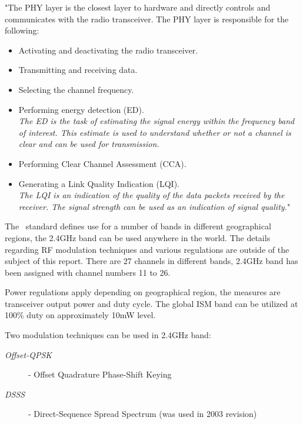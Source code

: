 
 "The PHY layer is the closest layer to hardware and directly controls
 and communicates with the radio transceiver.
 The PHY layer is responsible for the following:
 \begin{itemize}

        \item Activating and deactivating the radio transceiver.

	\item Transmitting and receiving data.

	\item Selecting the channel frequency.

	\item Performing energy detection (ED).\\
	\small{\emph{The ED is the task of estimating the signal energy within the
	frequency band of interest. This estimate is used to understand
	whether or not a channel is clear and can be used for transmission.}}

	\item Performing Clear Channel Assessment (CCA).

	\item Generating a Link Quality Indication (LQI).\\
	\small{\emph{The LQI is an indication of the quality of the data packets
	received by the receiver. The signal strength can be used as
	an indication of signal quality.}}"
	\end{itemize}

 The \WPAN\ standard defines use
 for a number of bands in different geographical regions, the 2.4GHz
 band can be used anywhere in the world.  The details regarding RF
 modulation techniques and various regulations are outside of the
 subject of this report. There are 27 channels in different bands, 
 2.4GHz band has been assigned with channel numbers 11 to 26.

  Power regulations apply depending on geographical region, the
 measures are transceiver output power and duty cycle. The global
 ISM band can be utilized at 100\% duty on approximately 10mW level.

 Two modulation techniques can be used in 2.4GHz band:
 \begin{description}
 \item[\emph{Offset-QPSK}]- Offset Quadrature Phase-Shift Keying
 \cite{links:wiki:qpsk}
 \item[\emph{DSSS}]- Direct-Sequence Spread Spectrum (was used in 2003 revision)
 \cite{links:wiki:dsss}
 \end{description}

